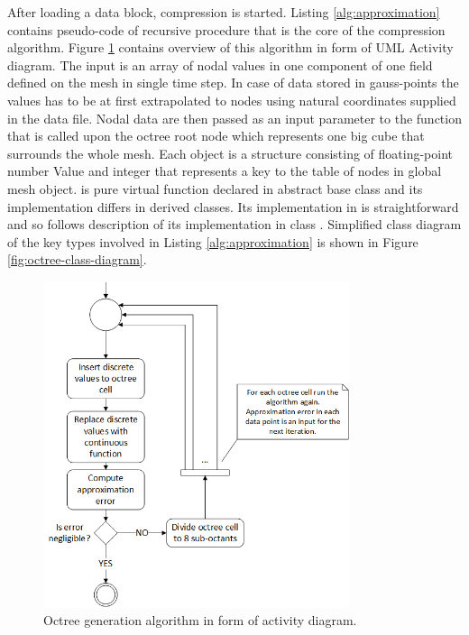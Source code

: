 After loading a data block, compression is started. Listing \ref{alg:approximation} contains pseudo-code of recursive procedure that is the core of the compression algorithm. Figure \ref{fig:octree-generation} contains overview of this algorithm in form of UML Activity diagram. The input is an array of nodal values in one component of one field defined on the mesh in single time step. In case of data stored in gauss-points the values has to be at first extrapolated to nodes using natural coordinates supplied in the data file. Nodal data are then passed as an input parameter  to the function  that is called upon the octree root node which represents one big cube that surrounds the whole mesh. Each  object is a structure consisting of floating-point number Value and integer  that represents a key to the table of nodes in global mesh object.  is pure virtual function declared in abstract base class  and its implementation differs in derived classes. Its implementation in  is straightforward and so follows description of its implementation in class . Simplified class diagram of the key types involved in Listing \ref{alg:approximation} is shown in Figure \ref{fig:octree-class-diagram}.

\begin{figure}[H]
\centering
\includegraphics[width=0.8\textwidth]{figures/chapter-approximation/figure2}
\decoRule
\caption[Octree generation.]{Octree generation algorithm in form of activity diagram.}
\label{fig:octree-generation}
\end{figure}

